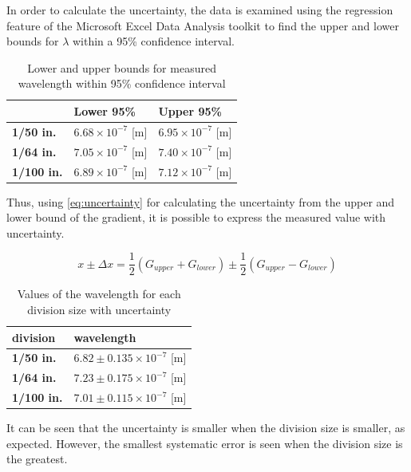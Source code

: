 \documentclass{article}
\begin{document}
In order to calculate the uncertainty, the data is examined using the regression feature of the Microsoft Excel Data Analysis toolkit to find the upper and lower bounds for $\lambda$ within a 95\% confidence interval.

\begin{table}[H]
\begin{tabular}{|l|l|l|}
\hline
               & \textbf{Lower 95\%}    & \textbf{Upper 95\%}   \\ \hline
\textbf{1/50 in.}  & $6.68 \times 10^{-7}$ [m] & $6.95 \times 10^{-7}$ [m] \\ \hline
\textbf{1/64 in.}  & $7.05 \times 10^{-7}$ [m] & $7.40 \times 10^{-7}$ [m] \\ \hline
\textbf{1/100 in.} & $6.89 \times 10^{-7}$ [m]  & $7.12 \times 10^{-7}$ [m] \\ \hline
\end{tabular}
\caption{Lower and upper bounds for measured wavelength within 95\% confidence interval}
\label{tb:lambda}
\end{table}

Thus, using \eqref{eq:uncertainty} \autocite{Palmer} for calculating the uncertainty from the upper and lower bound of the gradient, it is possible to express the measured value with uncertainty.

\begin{equation}\label{eq:uncertainty}
  x \pm \Delta x = \frac{1}{2}(G_{upper} + G_{lower})  \pm \frac{1}{2} (G_{upper} - G_{lower})
\end{equation}

\begin{table}[H]
\begin{tabular}{|l|l|}
\hline
\textbf{division}  & \textbf{wavelength}                 \\ \hline
\textbf{1/50 in.}  & $6.82 \pm 0.135 \times 10^{-7}$ [m] \\ \hline
\textbf{1/64 in.}  & $7.23 \pm 0.175 \times 10^{-7}$ [m] \\ \hline
\textbf{1/100 in.} & $7.01 \pm 0.115 \times 10^{-7}$ [m] \\ \hline
\end{tabular}
\caption{Values of the wavelength for each division size with uncertainty}
\label{tb:result}
\end{table}

It can be seen that the uncertainty is smaller when the division size is smaller, as expected. However, the smallest systematic error is seen when the division size is the greatest.
\end{document}

